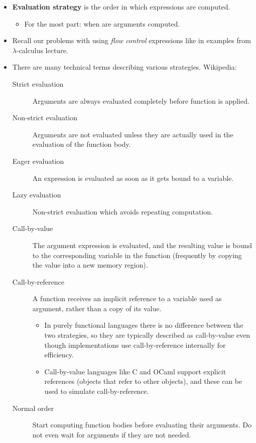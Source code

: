 \documentclass{beamer}
\newcommand{\tmem}[1]{{\em #1\/}}
\newcommand{\tmstrong}[1]{\textbf{#1}}
\newcommand{\tmverbatim}[1]{\text{{\ttfamily{#1}}}}
\begin{document}
\begin{itemize}
  \item {\tmstrong{Evaluation strategy}} is the order in which expressions are
  computed.
  \begin{itemize}
    \item For the most part: when are arguments computed.
  \end{itemize}
  \item Recall our problems with using {\tmem{flow control}} expressions like
  \tmverbatim{if\_then\_else} in examples from $\lambda$-calculus lecture.
  
  \item There are many technical terms describing various strategies.
  Wikipedia:
  \begin{description}
    \item[Strict evaluation] Arguments are always evaluated completely before
    function is applied.
    
    \item[Non-strict evaluation] Arguments are not evaluated unless they are
    actually used in the evaluation of the function body.
    
    \item[Eager evaluation] An expression is evaluated as soon as it gets
    bound to a variable.
    
    \item[Lazy evaluation] Non-strict evaluation which avoids repeating
    computation.
    
    \item[Call-by-value] The argument expression is evaluated, and the
    resulting value is bound to the corresponding variable in the function
    (frequently by copying the value into a new memory region).
    
    \item[Call-by-reference] A function receives an implicit reference to a
    variable used as argument, rather than a copy of its value.
    \begin{itemize}
      \item In purely functional languages there is no difference between the
      two strategies, so they are typically described as call-by-value even
      though implementations use call-by-reference internally for efficiency.
      
      \item Call-by-value languages like C and OCaml support explicit
      references (objects that refer to other objects), and these can be used
      to simulate call-by-reference.
    \end{itemize}
    \item[Normal order]  Start computing function bodies before evaluating
    their arguments. Do not even wait for arguments if they are not needed.
    

\end{description}
\end{itemize}
\end{document}
